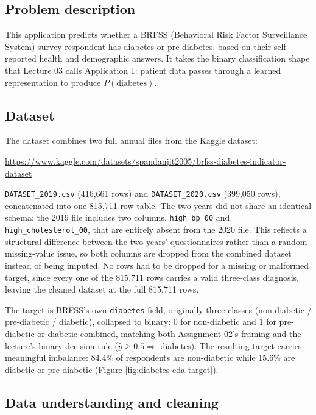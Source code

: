 \documentclass[11pt]{article}
\begin{document}
\subsection{Problem description}

This application predicts whether a BRFSS (Behavioral Risk Factor Surveillance System)
survey respondent has diabetes or pre-diabetes, based on their self-reported health and
demographic answers. It takes the binary classification shape that Lecture 03 calls
Application 1: patient data passes through a learned representation to produce
$P(\text{diabetes})$.

\subsection{Dataset}

The dataset combines two full annual files from the Kaggle dataset:
\begin{center}
\small\url{https://www.kaggle.com/datasets/spandanjit2005/brfss-diabetes-indicator-dataset}
\end{center}
\texttt{DATASET\_2019.csv} (416,661 rows) and \texttt{DATASET\_2020.csv} (399,050 rows),
concatenated into one 815,711-row table. The two years did not share an identical schema:
the 2019 file includes two columns, \verb|high_bp_00| and \verb|high_cholesterol_00|, that
are entirely absent from the 2020 file. This reflects a structural difference between the
two years' questionnaires rather than a random missing-value issue, so both columns are
dropped from the combined dataset instead of being imputed. No rows had to be dropped for a
missing or malformed target, since every one of the 815,711 rows carries a valid
three-class diagnosis, leaving the cleaned dataset at the full 815,711 rows.

The target is BRFSS's own \verb|diabetes| field, originally three classes
(non-diabetic / pre-diabetic / diabetic), collapsed to binary: 0 for non-diabetic and 1 for
pre-diabetic or diabetic combined, matching both Assignment 02's framing and the lecture's
binary decision rule ($\hat{y} \geq 0.5 \Rightarrow$ diabetes). The resulting target carries
meaningful imbalance: 84.4\% of respondents are non-diabetic while 15.6\% are diabetic or
pre-diabetic (Figure \ref{fig:diabetes-eda-target}).

\subsection{Data understanding and cleaning}
\end{document}
